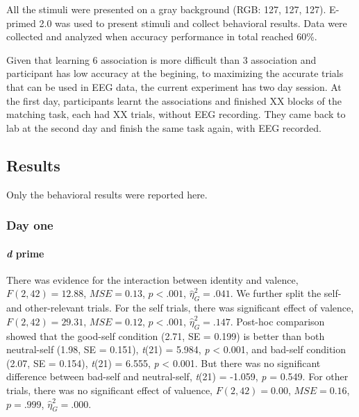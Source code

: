 \documentclass[man]{apa6}
\let\oldparagraph\paragraph
\renewcommand{\paragraph}[1]{\oldparagraph{#1}\mbox{}}
\begin{document}
All the stimuli were presented on a gray background (RGB: 127, 127, 127). E-primed 2.0 was used to present stimuli and collect behavioral results. Data were collected and analyzed when accuracy performance in total reached 60\%.

Given that learning 6 association is more difficult than 3 association and participant has low accuracy at the begining, to maximizing the accurate trials that can be used in EEG data, the current experiment has two day session. At the first day, participants learnt the associations and finished XX blocks of the matching task, each had XX trials, without EEG recording. They came back to lab at the second day and finish the same task again, with EEG recorded.

\hypertarget{results-10}{%
\subsection{Results}\label{results-10}}

Only the behavioral results were reported here.

\hypertarget{day-one}{%
\subsubsection{Day one}\label{day-one}}

\hypertarget{d-prime-3}{%
\paragraph{\texorpdfstring{\emph{d} prime}{d prime}}\label{d-prime-3}}

There was evidence for the interaction between identity and valence, \(F(2, 42) = 12.88\), \(\mathit{MSE} = 0.13\), \(p < .001\), \(\hat{\eta}^2_G = .041\). We further split the self- and other-relevant trials. For the self trials, there was significant effect of valence, \(F(2, 42) = 29.31\), \(\mathit{MSE} = 0.12\), \(p < .001\), \(\hat{\eta}^2_G = .147\). Post-hoc comparison showed that the good-self condition (2.71, SE = 0.199) is better than both neutral-self (1.98, SE = 0.151), \emph{t}(21) = 5.984, \emph{p} \textless{} 0.001, and bad-self condition (2.07, SE = 0.154), \emph{t}(21) = 6.555, \emph{p} \textless{} 0.001. But there was no significant difference between bad-self and neutral-self, \emph{t}(21) = -1.059, \emph{p} = 0.549. For other trials, there was no significant effect of valuence, \(F(2, 42) = 0.00\), \(\mathit{MSE} = 0.16\), \(p = .999\), \(\hat{\eta}^2_G = .000\).
\end{document}
